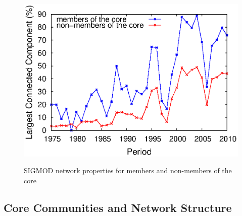 \begin{figure}[!htpb]
\begin{center}
{    \includegraphics[scale=.31]{graficos/core_over_time/core_community/sigmod_janela_3_core_maior_componente_conectado.eps}
  }
  \end{center}
  \caption{SIGMOD network properties for members and non-members of the core}
  \label{fig:metrics_comparing_core_community}
\end{figure}



\subsection{Core Communities and Network Structure}
\label{sub:corr}

